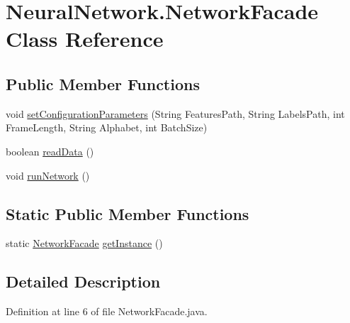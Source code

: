 \hypertarget{class_neural_network_1_1_network_facade}{\section{Neural\-Network.\-Network\-Facade Class Reference}
\label{class_neural_network_1_1_network_facade}
}
\subsection*{Public Member Functions}
\begin{DoxyCompactItemize}
\item 
void \hyperlink{class_neural_network_1_1_network_facade_a085af14f6e052bde8fb603c55304a23d}{set\-Configuration\-Parameters} (String Features\-Path, String Labels\-Path, int Frame\-Length, String Alphabet, int Batch\-Size)
\item 
boolean \hyperlink{class_neural_network_1_1_network_facade_a53cd343b6ac5a9fd35f90ae9222fe4b9}{read\-Data} ()
\item 
void \hyperlink{class_neural_network_1_1_network_facade_a1985a91f9886211228b927bca7c20f41}{run\-Network} ()
\end{DoxyCompactItemize}
\subsection*{Static Public Member Functions}
\begin{DoxyCompactItemize}
\item 
static \hyperlink{class_neural_network_1_1_network_facade}{Network\-Facade} \hyperlink{class_neural_network_1_1_network_facade_a60976bf6c0ef88c147e2bc4dbc68230f}{get\-Instance} ()
\end{DoxyCompactItemize}


\subsection{Detailed Description}


Definition at line 6 of file Network\-Facade.\-java.



